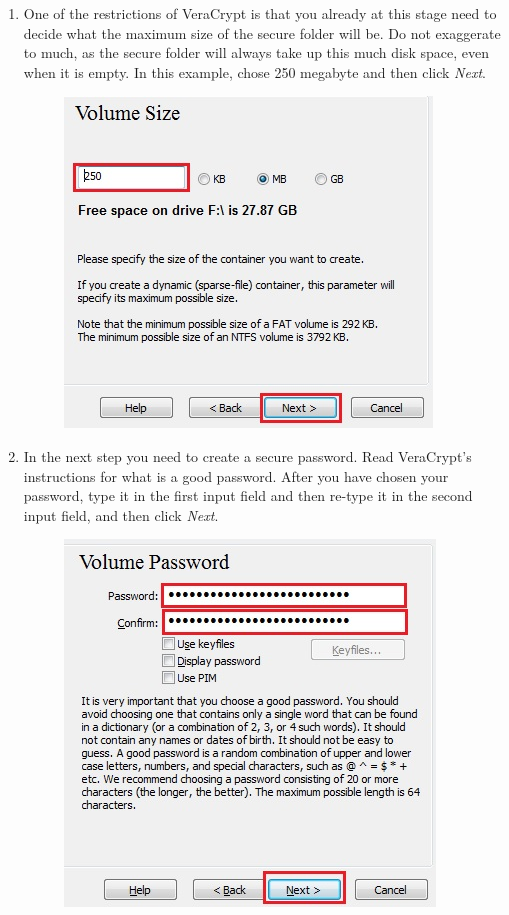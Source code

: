 \documentclass{tufte-handout}
\begin{document}
\begin{enumerate}
	\newpage
	
	\item One of the restrictions of VeraCrypt is that you already at this stage need to decide what the maximum size of the secure folder will be. Do not exaggerate to much, as the secure folder will always take up this much disk space, even when it is empty. In this example, chose 250 megabyte and then click \textit{Next}.
	\begin{figure}%
		\includegraphics[width=.7\linewidth]{img/vc_install_7.png}
	\end{figure}
	\FloatBarrier
	
	
	\item In the next step you need to create a secure password. Read VeraCrypt's instructions for what is a good password. After you have chosen your password, type it in the first input field and then re-type it in the second input field, and then click \textit{Next}.
	\begin{figure}%
		\includegraphics[width=.7\linewidth]{img/vc_install_8.png}
	\end{figure}
	\FloatBarrier
	

\end{enumerate}
\end{document}
